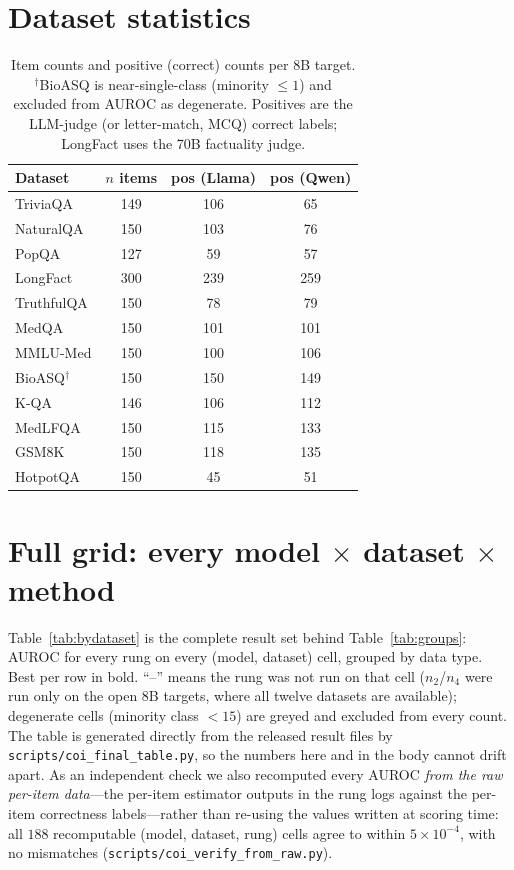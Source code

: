 \documentclass[11pt]{article}
\begin{document}
\section{Dataset statistics}\label{app:stats}
\begin{table}[t]
\centering\small
\begin{tabular}{lccc}
\toprule
Dataset & $n$ items & pos (Llama) & pos (Qwen) \\
\midrule
TriviaQA & 149 & 106 & 65 \\
NaturalQA & 150 & 103 & 76 \\
PopQA & 127 & 59 & 57 \\
LongFact & 300 & 239 & 259 \\
TruthfulQA & 150 & 78 & 79 \\
MedQA & 150 & 101 & 101 \\
MMLU-Med & 150 & 100 & 106 \\
BioASQ$^\dagger$ & 150 & 150 & 149 \\
K-QA & 146 & 106 & 112 \\
MedLFQA & 150 & 115 & 133 \\
GSM8K & 150 & 118 & 135 \\
HotpotQA & 150 & 45 & 51 \\
\bottomrule
\end{tabular}
\caption{Item counts and positive (correct) counts per 8B target. $^\dagger$BioASQ is
near-single-class (minority $\le 1$) and excluded from AUROC as degenerate. Positives are the
LLM-judge (or letter-match, MCQ) correct labels; LongFact uses the 70B factuality judge.}
\label{tab:stats}
\end{table}

\section{Full grid: every model $\times$ dataset $\times$ method}\label{app:bydataset}
Table~\ref{tab:bydataset} is the complete result set behind Table~\ref{tab:groups}: AUROC for
every rung on every (model, dataset) cell, grouped by data type. Best per row in bold. ``--''
means the rung was not run on that cell ($n_2$/$n_4$ were run only on the open 8B targets, where
all twelve datasets are available); degenerate cells (minority class $<15$) are greyed and
excluded from every count. The table is generated directly from the released result files by
\texttt{scripts/coi\_final\_table.py}, so the numbers here and in the body cannot drift apart.
As an independent check we also recomputed every AUROC \emph{from the raw per-item data}---the
per-item estimator outputs in the rung logs against the per-item correctness labels---rather than
re-using the values written at scoring time: all $188$ recomputable (model, dataset, rung) cells
agree to within $5\times10^{-4}$, with no mismatches
(\texttt{scripts/coi\_verify\_from\_raw.py}).
\end{document}
